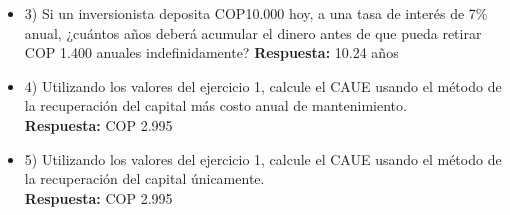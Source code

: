 \begin{itemize}
       \textbf{ Respuesta:} Se selecciona la máquina B puesto que CAUEb (COP 16.92) < CAUEa (COP 18.44)
       \\
 \item 3)  Si un inversionista deposita COP10.000 hoy, a una tasa de interés de 7\% anual, ¿cuántos años deberá acumular el dinero antes de que pueda retirar  COP  1.400 anuales indefinidamente?
       \textbf{ Respuesta:} 10.24 años
       \\
 \item 4)  Utilizando los valores del ejercicio 1, calcule el CAUE usando el método de la recuperación del capital más costo anual de mantenimiento.\\
       \textbf{ Respuesta:} COP 2.995
       \\
 \item 5)  Utilizando los valores del ejercicio 1, calcule el CAUE usando el método de la recuperación del capital únicamente.\\
       \textbf{ Respuesta:} COP 2.995

\end{itemize}

